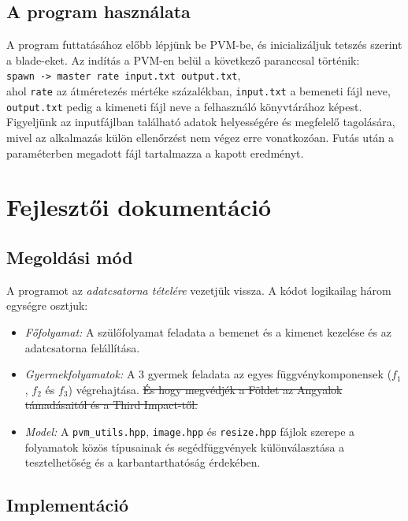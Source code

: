 \documentclass[12pt]{article}
\begin{document}
\subsection{A program használata}

A program futtatásához előbb lépjünk be PVM-be, és inicializáljuk tetszés szerint a blade-eket.
Az indítás a PVM-en belül a következő paranccsal történik:
\\
\verb|spawn -> master rate input.txt output.txt|,
\\
ahol \verb|rate| az átméretezés mértéke százalékban, \verb|input.txt| a bemeneti fájl neve, \verb|output.txt| pedig
a kimeneti fájl neve a felhasználó könyvtárához képest.
\\
Figyeljünk az inputfájlban található adatok helyességére és megfelelő tagolására, mivel
az alkalmazás külön ellenőrzést nem végez erre vonatkozóan. Futás után a paraméterben megadott
fájl tartalmazza a kapott eredményt.

\section{Fejlesztői dokumentáció}

\subsection{Megoldási mód}

A programot az \textit{adatcsatorna tételére} vezetjük vissza.
A kódot logikailag három egységre osztjuk:
\begin{itemize}
	\item \textit{Főfolyamat:} A szülőfolyamat feladata a bemenet és a kimenet kezelése és az adatcsatorna felállítása.
	\item \textit{Gyermekfolyamatok:} A 3 gyermek feladata az egyes függvénykomponensek ($ f_1 $, $ f_2 $ és $ f_3 $) végrehajtása.
			\sout{És hogy megvédjék a Földet az Angyalok támadásaitól és a Third Impact-től.}
	\item \textit{Model:} A \verb|pvm_utils.hpp|, \verb|image.hpp| és \verb|resize.hpp| fájlok szerepe a folyamatok közös típusainak és segédfüggvények különválasztása a tesztelhetőség és a karbantarthatóság érdekében.
\end{itemize}

\subsection{Implementáció}
\end{document}
